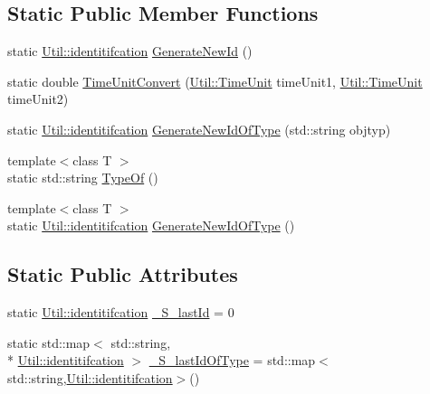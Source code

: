 \subsection*{Static Public Member Functions}
\begin{DoxyCompactItemize}
\item 
static \hyperlink{class_util_ad17d458d9344b10bba64347e514d6d71}{Util\-::identitifcation} \hyperlink{class_util_a59ecba8027c38a9d0a3a0e9e9dc94ad7}{Generate\-New\-Id} ()
\item 
static double \hyperlink{class_util_a5f537febaa83db4721745a4730657bab}{Time\-Unit\-Convert} (\hyperlink{class_util_aadbd82055afeaa7d4fb4da513de628ff}{Util\-::\-Time\-Unit} time\-Unit1, \hyperlink{class_util_aadbd82055afeaa7d4fb4da513de628ff}{Util\-::\-Time\-Unit} time\-Unit2)
\item 
static \hyperlink{class_util_ad17d458d9344b10bba64347e514d6d71}{Util\-::identitifcation} \hyperlink{class_util_a96dd76236d7f5888b8dac562e93f9278}{Generate\-New\-Id\-Of\-Type} (std\-::string objtyp)
\item 
{\footnotesize template$<$class T $>$ }\\static std\-::string \hyperlink{class_util_a1010d1207367e48e1d417381f32abf1f}{Type\-Of} ()
\item 
{\footnotesize template$<$class T $>$ }\\static \hyperlink{class_util_ad17d458d9344b10bba64347e514d6d71}{Util\-::identitifcation} \hyperlink{class_util_aec5f31f4f467113c25a6aef7bb5f4a40}{Generate\-New\-Id\-Of\-Type} ()
\end{DoxyCompactItemize}
\subsection*{Static Public Attributes}
\begin{DoxyCompactItemize}
\item 
static \hyperlink{class_util_ad17d458d9344b10bba64347e514d6d71}{Util\-::identitifcation} \hyperlink{class_util_afe2f6d8c09ef1108299a4dc8ec59b133}{\-\_\-\-S\-\_\-last\-Id} = 0
\item 
static std\-::map$<$ std\-::string, \\*
\hyperlink{class_util_ad17d458d9344b10bba64347e514d6d71}{Util\-::identitifcation} $>$ \hyperlink{class_util_a06a8897362f4bd17c68d59557083fc56}{\-\_\-\-S\-\_\-last\-Id\-Of\-Type} = std\-::map$<$std\-::string,\hyperlink{class_util_ad17d458d9344b10bba64347e514d6d71}{Util\-::identitifcation}$>$()
\end{DoxyCompactItemize}


